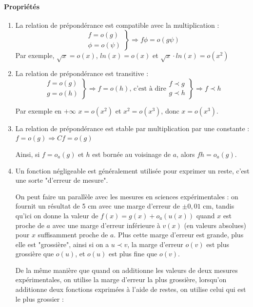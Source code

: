 \documentclass[]{article}
\begin{document}
\paragraph{Propriétés}
\begin{enumerate}
	\item La relation de prépondérance est compatible avec la multiplication : 
	$$\left. \begin{array}{c}
		f=o(g) \\
		\phi = o(\psi)
	\end{array} \right\} \Longrightarrow f \phi = o(g \psi)$$
	Par exemple, $\sqrt{x}=o(x)$, $ln(x)=o(x)$ et $\sqrt{x} \cdot ln(x)=o(x^2)$
	
	\newpage
	\item La relation de prépondérance est transitive : 
	$$\left. \begin{array}{c}
		f=o(g) \\
		g = o(h)
	\end{array} \right\} \Longrightarrow f = o(h) \text{, c'est à dire} \left. \begin{array}{c}
			f \prec g \\
			g \prec h
		\end{array} \right\} \Longrightarrow f \prec h
	$$

	Par exemple en $+ \infty$ $x=o(x^2)$ et $x^2=o(x^3)$, donc $x=o(x^3)$.
	
	\item La relation de prépondérance est stable par multiplication par une constante : $f=o(g) \Longrightarrow Cf = o(g)$
	
	Ainsi, si $f=o_a(g)$ et $h$ est bornée au voisinage de $a$, alors $fh=o_a(g)$.
	
	\item Un fonction négligeable est généralement utilisée pour exprimer un reste, c'est une sorte "d'erreur de mesure".
	
	On peut faire un parallèle avec les mesures en sciences expérimentales : on fournit un résultat de 5 cm avec une marge d'erreur de $\pm 0,01$ cm, tandis qu'ici on donne la valeur de $f(x)=g(x)+o_a(u(x))$ quand $x$ est proche de $a$ avec une marge d'erreur inférieure à $v(x)$ (en valeurs absolues) pour $x$ suffisamment proche de $a$. Plus cette marge d'erreur est grande, plus elle est "grossière", ainsi si on a $u \prec v$, la marge d'erreur $o(v)$ est plus grossière que $o(u)$, et $o(u)$ est plus fine que $o(v)$.
	
	De la même manière que quand on additionne les valeurs de deux mesures expérimentales, on utilise la marge d'erreur la plus grossière, lorsqu'on additionne deux fonctions exprimées à l'aide de restes, on utilise celui qui est le plus grossier :
	

\end{enumerate}
\end{document}
